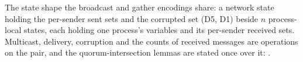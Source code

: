 \begin{definition}
  \label{def:aba-networkstate}
  \leanok
  The state shape the broadcast and gather encodings share: a network state holding the per-sender sent sets and the corrupted set (D5, D1) beside $n$ process-local states, each holding one process's variables and its per-sender received sets.
  Multicast, delivery, corruption and the counts of received messages are operations on the pair, and the quorum-intersection lemmas are stated once over it: .
\end{definition}
